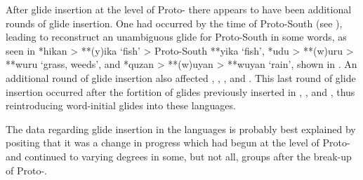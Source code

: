 After glide insertion at the level of Proto- there appears
to have been additional rounds of glide insertion.
One had occurred by the time of Proto-South  (see ),
leading \citet{Nivens2017} to reconstruct an unambiguous glide
for Proto-South  in some words,
as seen in *hikan > **(y)ika ‘fish’ > Proto-South  **yika
‘fish’, *udu > **(w)uru > **wuru ‘grass,
weeds’, and *quzan > **(w)uyan > **wuyan ‘rain’,
shown in .
An additional round of glide insertion also
affected , , , and .
This last round of glide insertion occurred after the fortition
of glides previously inserted in ,
, and , thus reintroducing word-initial glides into these languages.

The data regarding glide insertion in the  languages
is probably best explained by positing that it was a change in
progress which had begun at the level of Proto-
and continued to varying degrees in some,
but not all, groups after the break-up of Proto-.
